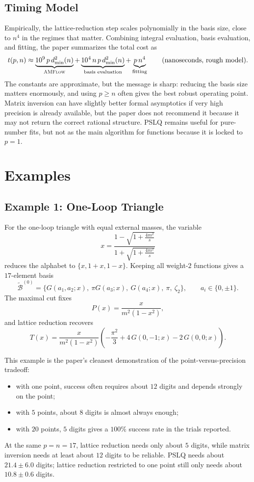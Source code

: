 \documentclass[11pt]{article}
\newcommand{\cB}{\mathcal{B}}
\newcommand{\dmin}{d_{\min}}
\begin{document}
\subsection{Timing Model}
Empirically, the lattice-reduction step scales polynomially in the basis size, close to $n^4$ in the regimes that matter. Combining integral evaluation, basis evaluation, and fitting, the paper summarizes the total cost as
\begin{equation}
t(p,n)\approx
\underbrace{10^9\,p\,\dmin^2(n)}_{\text{\textsc{AMFlow}}}
+
\underbrace{10^4\,n\,p\,\dmin^2(n)}_{\text{basis evaluation}}
+
\underbrace{p\,n^4}_{\text{fitting}}
\qquad \text{(nanoseconds, rough model)}.
\label{eq:timing-model}
\end{equation}
The constants are approximate, but the message is sharp: reducing the basis size matters enormously, and using $p\ge n$ often gives the best robust operating point. Matrix inversion can have slightly better formal asymptotics if very high precision is already available, but the paper does not recommend it because it may not return the correct rational structure. PSLQ remains useful for pure-number fits, but not as the main algorithm for functions because it is locked to $p=1$.

\section{Examples}
\subsection{Example 1: One-Loop Triangle}
For the one-loop triangle with equal external masses, the variable
\begin{equation}
x=\frac{1-\sqrt{1+\frac{4m^2}{s}}}{1+\sqrt{1+\frac{4m^2}{s}}}
\end{equation}
reduces the alphabet to $\{x,1+x,1-x\}$. Keeping all weight-$2$ functions gives a $17$-element basis
\[
\widetilde{\cB}^{(0)}=\{G(a_1,a_2;x),\ \pi G(a_3;x),\ G(a_4;x),\ \pi,\ \zeta_2\},
\qquad a_i\in\{0,\pm1\}.
\]
The maximal cut fixes
\[
P(x)=\frac{x}{m^2(1-x^2)},
\]
and lattice reduction recovers
\begin{equation}
T(x)=\frac{x}{m^2(1-x^2)}
\left(
-\frac{\pi^2}{3}+4\,G(0,-1;x)-2\,G(0,0;x)
\right).
\label{eq:one-loop-result}
\end{equation}

This example is the paper's cleanest demonstration of the point-versus-precision tradeoff:
\begin{itemize}
    \item with one point, success often requires about $12$ digits and depends strongly on the point;
    \item with $5$ points, about $8$ digits is almost always enough;
    \item with $20$ points, $5$ digits gives a $100\%$ success rate in the trials reported.
\end{itemize}
At the same $p=n=17$, lattice reduction needs only about $5$ digits, while matrix inversion needs at least about $12$ digits to be reliable. PSLQ needs about $21.4\pm 6.0$ digits; lattice reduction restricted to one point still only needs about $10.8\pm 0.6$ digits.
\end{document}
